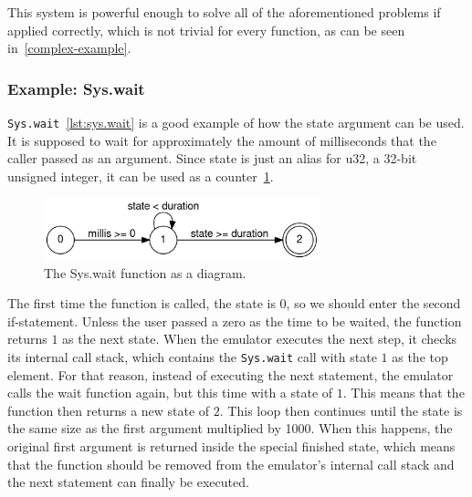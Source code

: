 This system is powerful enough to solve all of the aforementioned problems if applied correctly, which is not trivial for every function, as can be seen in~\cref{complex-example}.
\subsubsection{Example: Sys.wait} \label{sys.wait-example}
\verb+Sys.wait+~\ref{lst:sys.wait} is a good example of how the state argument can be used.
It is supposed to wait for approximately the amount of milliseconds that the caller passed as an argument.
Since state is just an alias for u32, a 32-bit unsigned integer, it can be used as a counter~\ref{fig:wait-dfa}.
\begin{center}
  \begin{figure}[ht]
    \centering
    \includegraphics[width=8cm]{fig/wait.png}
    \caption{The Sys.wait function as a diagram.}
    \label{fig:wait-dfa}
  \end{figure}
\end{center}
The first time the function is called, the state is \(0\), so we should enter the second if-statement.
Unless the user passed a zero as the time to be waited, the function returns \(1\) as the next state.
When the emulator executes the next step, it checks its internal call stack, which contains the \verb+Sys.wait+ call with state \(1\) as the top element.
For that reason, instead of executing the next statement, the emulator calls the wait function again, but this time with a state of \(1\).
This means that the function then returns a new state of \(2\).
This loop then continues until the state is the same size as the first argument multiplied by 1000.
When this happens, the original first argument is returned inside the special finished state, which means that the function should be removed from the emulator's internal call stack and the next statement can finally be executed.
